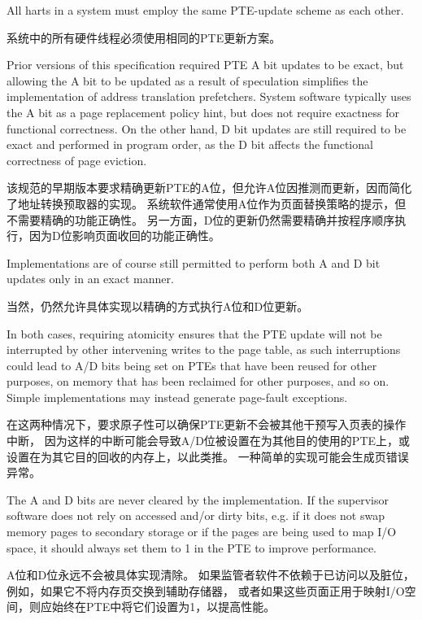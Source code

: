 All harts in a system must employ the same PTE-update scheme as each other.

系统中的所有硬件线程必须使用相同的PTE更新方案。

\begin{commentary}
Prior versions of this specification required PTE A bit updates to be exact,
but allowing the A bit to be updated as a result of speculation simplifies
the implementation of address translation prefetchers.  System software
typically uses the A bit as a page replacement policy hint, but does not
require exactness for functional correctness.  On the other hand, D bit updates
are still required to be exact and performed in program order, as the D bit
affects the functional correctness of page eviction.

该规范的早期版本要求精确更新PTE的A位，但允许A位因推测而更新，因而简化了地址转换预取器的实现。
系统软件通常使用A位作为页面替换策略的提示，但不需要精确的功能正确性。
另一方面，D位的更新仍然需要精确并按程序顺序执行，因为D位影响页面收回的功能正确性。

Implementations are of course still permitted to perform both A and D bit
updates only in an exact manner.

当然，仍然允许具体实现以精确的方式执行A位和D位更新。

In both cases, requiring atomicity ensures that the PTE update will not be
interrupted by other intervening writes to the page table, as such interruptions
could lead to A/D bits being set on PTEs that have been reused for other
purposes, on memory that has been reclaimed for other purposes, and so on.
Simple implementations may instead generate page-fault exceptions.

在这两种情况下，要求原子性可以确保PTE更新不会被其他干预写入页表的操作中断，
因为这样的中断可能会导致A/D位被设置在为其他目的使用的PTE上，或设置在为其它目的回收的内存上，以此类推。
一种简单的实现可能会生成页错误异常。

The A and D bits are never cleared by the implementation.  If the
supervisor software does not rely on accessed and/or dirty bits,
e.g. if it does not swap memory pages to secondary storage or if the
pages are being used to map I/O space, it should always set them to 1
in the PTE to improve performance.

A位和D位永远不会被具体实现清除。
如果监管者软件不依赖于已访问以及脏位，例如，如果它不将内存页交换到辅助存储器，
或者如果这些页面正用于映射I/O空间，则应始终在PTE中将它们设置为1，以提高性能。
\end{commentary}

